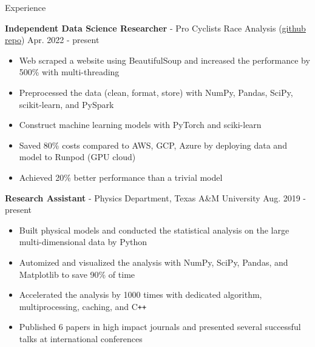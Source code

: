 \documentclass{resume}
\begin{document}
\vspace{-0.25em}
\begin{rSection}{Experience}
    \vspace{-1.5em}
    \item \textbf{Independent Data Science Researcher} - {Pro Cyclists Race Analysis} (\href{https://github.com/noctildon/pro_cyclists}{github repo}) \hfill Apr. 2022 - present
        \begin{itemize}
        \item Web scraped a website using BeautifulSoup and increased the performance by 500\% with multi-threading
        \item Preprocessed the data (clean, format, store) with NumPy, Pandas, SciPy, scikit-learn, and PySpark
        \item Construct machine learning models with PyTorch and sciki-learn
        \item Saved 80\% costs compared to AWS, GCP, Azure by deploying data and model to Runpod (GPU cloud)
        \item Achieved 20\% better performance than a trivial model
        \end{itemize}

    \item \textbf{Research Assistant} - Physics Department, Texas A\&M University \hfill Aug. 2019 - present
        \begin{itemize}
        \item Built physical models and conducted the statistical analysis on the large multi-dimensional data by Python
        \item Automized and visualized the analysis with NumPy, SciPy, Pandas, and Matplotlib to save 90\% of time
        \item Accelerated the analysis by 1000 times with dedicated algorithm, multiprocessing, caching, and C\texttt{++}
        \item Published 6 papers in high impact journals and presented several successful talks at international conferences
        \end{itemize}


\end{rSection}
\end{document}
